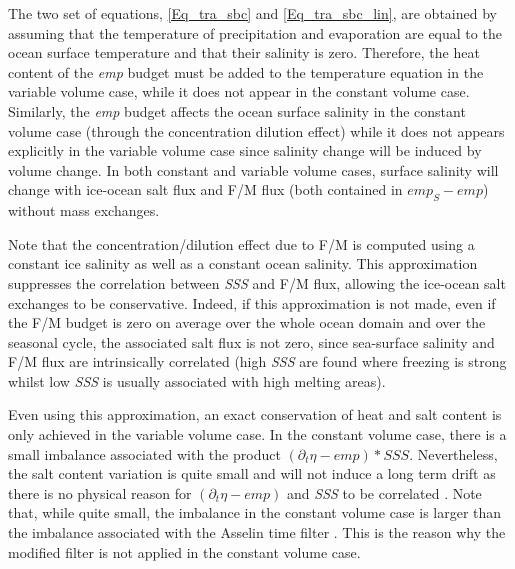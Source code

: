 The two set of equations, \eqref{Eq_tra_sbc} and \eqref{Eq_tra_sbc_lin}, are obtained 
by assuming that the temperature of precipitation and evaporation are equal to
the ocean surface temperature and that their salinity is zero. Therefore, the heat content
of the \textit{emp} budget must be added to the temperature equation in the variable volume case, 
while it does not appear in the constant volume case. Similarly, the \textit{emp} budget affects 
the ocean surface salinity in the constant volume case (through the concentration dilution effect)
while it does not appears explicitly in the variable volume case since salinity change will be
induced by volume change. In both constant and variable volume cases, surface salinity 
will change with ice-ocean salt flux and F/M flux (both contained in $\textit{emp}_S - \textit{emp}$) without mass exchanges.

Note that the concentration/dilution effect due to F/M is computed using
a constant ice salinity as well as a constant ocean salinity. 
This approximation suppresses the correlation between \textit{SSS} 
and F/M flux, allowing the ice-ocean salt exchanges to be conservative.
Indeed, if this approximation is not made, even if the F/M budget is zero 
on average over the whole ocean domain and over the seasonal cycle, 
the associated salt flux is not zero, since sea-surface salinity and F/M flux are 
intrinsically correlated (high \textit{SSS} are found where freezing is 
strong whilst low \textit{SSS} is usually associated with high melting areas).

Even using this approximation, an exact conservation of heat and salt content 
is only achieved in the variable volume case. In the constant volume case, 
there is a small imbalance associated with the product $(\partial_t\eta - \textit{emp}) * \textit{SSS}$.
Nevertheless, the salt content variation is quite small and will not induce
a long term drift as there is no physical reason for $(\partial_t\eta - \textit{emp})$ 
and \textit{SSS} to be correlated \citep{Roullet_Madec_JGR00}. 
Note that, while quite small, the imbalance in the constant volume case is larger 
than the imbalance associated with the Asselin time filter \citep{Leclair_Madec_OM09}. 
This is the reason why the modified filter is not applied in the constant volume case.

